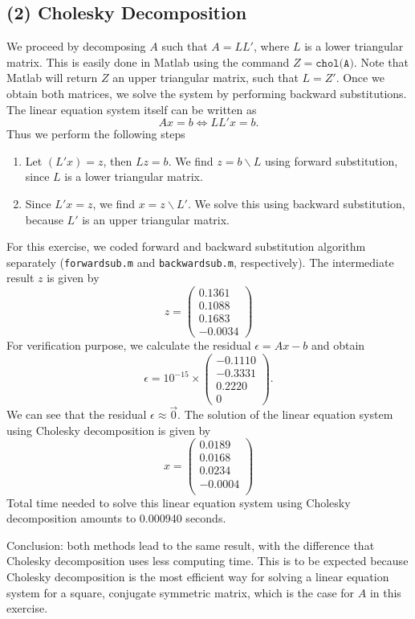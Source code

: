 \documentclass[11pt]{article}
\newcommand{\1}{\mathbbm{1}}
\begin{document}
\subsection*{(2) Cholesky Decomposition}
We proceed by decomposing $A$ such that $A=LL'$, where $L$ is a lower triangular matrix. This is easily done in Matlab using the command $Z= \texttt{chol(A)}$. Note that Matlab will return $Z$ an upper triangular matrix, such that $L=Z'$. Once we obtain both matrices, we solve the system by performing backward substitutions. The linear equation system itself can be written as 
\[Ax=b \Leftrightarrow LL'x =b.\]
Thus we perform the following steps
\begin{enumerate}
	\item Let $(L'x) =z$, then $Lz=b$. We find $z = b\backslash L$ using forward substitution, since $L$ is a lower triangular matrix.
	\item Since $L'x = z$, we find $x=z\backslash L'$. We solve this using backward substitution, because $L'$ is an upper triangular matrix.
\end{enumerate} 
For this exercise, we coded forward and backward substitution algorithm separately (\texttt{forwardsub.m} and \texttt{backwardsub.m}, respectively). The intermediate result $z$ is given by
\[
z = \begin{pmatrix}
 0.1361\\
0.1088\\
0.1683\\
-0.0034
\end{pmatrix}
\]
For verification purpose, we calculate the residual $\epsilon = Ax-b$ and obtain
\[
\epsilon =   10^{-15} \times \begin{pmatrix}
   -0.1110\\
-0.3331\\
0.2220\\
0
\end{pmatrix}.
\]
We can see that the residual $\epsilon\approx\vec{0}$. The solution of the linear equation system using Cholesky decomposition is given by
\[x = \begin{pmatrix}
	0.0189\\
	0.0168\\
	0.0234\\
	-0.0004\\
\end{pmatrix}\]
Total time needed to solve this linear equation system using Cholesky decomposition amounts to 0.000940 seconds.

Conclusion: both methods lead to the same result, with the difference that Cholesky decomposition uses less computing time. This is to be expected because Cholesky decomposition is the most efficient way for solving a linear equation system for a square, conjugate symmetric matrix, which is the case for $A$ in this exercise. 
\end{document}
